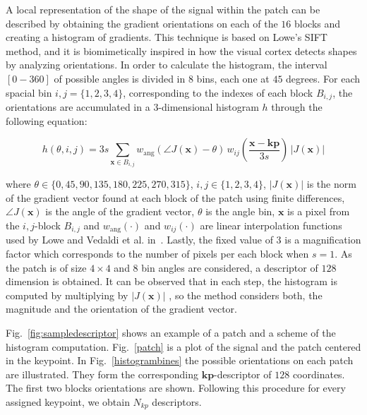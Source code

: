 \documentclass[entropy,article,submit,moreauthors,pdftex,10pt,a4paper]{mdpi}
\begin{document}
A local representation of the shape of the signal within the patch can be described by obtaining the gradient orientations on each of the $16$ blocks and creating a histogram of gradients.  This technique is based on Lowe's SIFT~\citep{Lowe2004} method, and it is biomimetically inspired in how the visual cortex detects shapes by analyzing orientations.   In order to calculate the histogram, the interval $[0-360]$ of possible angles is divided in $8$ bins, each one at $45$ degrees.
 For each spacial bin $ i,j = \{1,2,3,4\} $, corresponding to the indexes of each block $B_{i,j}$,  the orientations are accumulated in a  $3$-dimensional histogram $h$ through the following equation: %

\begin{equation}
 h(\theta,i,j) = 3s \sum_{\mathbf{x} \in B_{i,j}} w_\mathrm{ang}(\angle J(\mathbf{x}) - \theta)\, w_{ij}\left(\frac{\mathbf{x} - \mathbf{kp}}{3 s}\right)\, |J(\mathbf{x})|
\label{eq:histogram}
\end{equation}


\noindent  where $ \theta \in \{0, 45, 90, 135, 180, 225, 270, 315\} $, $ i,j \in \{1,2,3,4\} $, $ |J(\mathbf{x})| $ is the norm of the gradient vector found at each block of the patch using finite differences, $\angle J(\mathbf{x}) $ is the angle of the gradient vector,  $\theta$ is the angle bin, $\mathbf{x}$ is a pixel from  the $i,j$-block $B_{i,j}$ and $ w_\mathrm{ang}(\cdot) $  and $ w_{ij}(\cdot) $ are linear interpolation functions used by Lowe and Vedaldi et al. in~\citep{Lowe2004,Vedaldi2010}.  Lastly, the fixed value of $ 3 $ is a magnification factor which corresponds to the number of pixels per each block when $s = 1$.  As the patch is of size $4 \times 4$ and  $8$ bin angles are considered, a descriptor of $128$ dimension is obtained. It can be observed that in each step, the histogram is computed by multiplying by $ |J(\mathbf{x})| $ , so the method considers both, the magnitude and the orientation of the gradient vector. 

Fig.~\ref{fig:sampledescriptor} shows an example of a patch and a scheme of the histogram computation. Fig.~\ref{patch} is a plot of the signal and the patch centered in the keypoint. In Fig.~\ref{histogrambines} the possible orientations on each patch are illustrated. They form the corresponding $\mathbf{kp}$-descriptor of $128$ coordinates. The first two blocks orientations are shown.  Following this procedure for every assigned keypoint, we obtain $N_{kp}$ descriptors.
 
\end{document}
